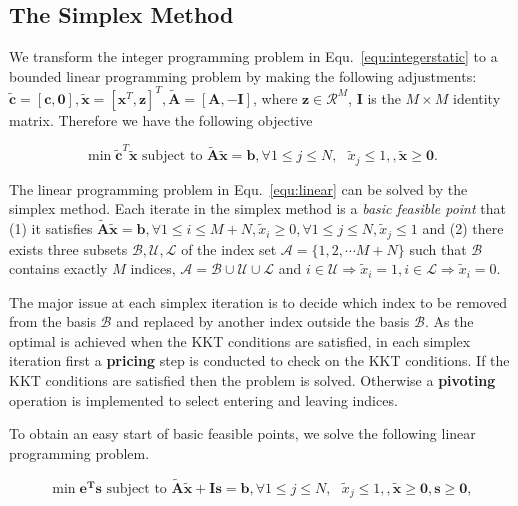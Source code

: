 \documentclass[envcountsame]{llncs}
\begin{document}
\subsection{The Simplex Method}
We transform the integer programming problem in Equ.~\ref{equ:integerstatic} to a bounded linear programming problem by making the following adjustments: $\tilde{\mathbf{c}}=[\mathbf{c},\mathbf{0}],\tilde{\mathbf{x}}=[\mathbf{x}^T,\mathbf{z}]^T,\tilde{\mathbf{A}}=[\mathbf{A},-\mathbf{I}]$, where $\mathbf{z}\in\mathcal{R}^M$, $ \mathbf{I}$ is the $M\times M$ identity matrix. Therefore we have the following objective

\vspace{-0.3cm}
\begin{equation}\label{equ:linear}
\min \tilde{\mathbf{c}}^T \tilde{\mathbf{x}}\textrm{ subject to } \tilde{\mathbf{A}}\tilde{\mathbf{x}} = \mathbf{b}, \forall 1\leq j\leq N,\textrm{ } \tilde{x}_j \leq 1, ,\tilde{\mathbf{x}}\geq \mathbf{0}.
\end{equation}
\vspace{-0.6cm}

The linear programming problem in Equ.~\ref{equ:linear} can be solved by the simplex method. Each iterate in the simplex method is a \emph{basic feasible point} that (1) it satisfies $\tilde{\mathbf{A}}\tilde{\mathbf{x}} = \mathbf{b}, \forall 1\leq i\leq M+N,\tilde{x}_i \geq 0,\forall 1\leq j\leq N, \tilde{x}_j \leq 1$ and (2) there exists three subsets $\mathcal{B,U,L}$ of the index set $\mathcal{A}=\{1,2,\cdots M+N\}$ such that $\mathcal{B}$ contains exactly $M$ indices, $\mathcal{A}=\mathcal{B}\cup \mathcal{U} \cup \mathcal{L}$ and $i \in \mathcal{U} \Rightarrow \tilde{x}_i=1,i \in \mathcal{L} \Rightarrow \tilde{x}_i=0$.

The major issue at each simplex iteration is to decide which index to be removed from the basis $\mathcal{B}$ and replaced by another index outside the basis $\mathcal{B}$.  As the optimal is achieved when the KKT conditions are satisfied, in each simplex iteration first  a \textbf{pricing} step is conducted to check on the KKT conditions.  If the KKT conditions are satisfied then the problem is solved. Otherwise a \textbf{pivoting} operation is implemented to select entering and leaving indices.

To obtain an easy start of basic feasible points, we solve the following linear programming problem.

\vspace{-0.6cm}
\begin{equation}\label{equ:linearphaseI}
\min \mathbf{e^{T}s} \textrm{ subject to } \tilde{\mathbf{A}}\tilde{\mathbf{x}} + \mathbf{Is} = \mathbf{b},  \forall 1\leq j\leq N,\textrm{ } \tilde{x}_j \leq 1, ,\tilde{\mathbf{x}}\geq \mathbf{0}, \mathbf{s}\geq \mathbf{0},
\end{equation}
\vspace{-0.6cm}
\end{document}
